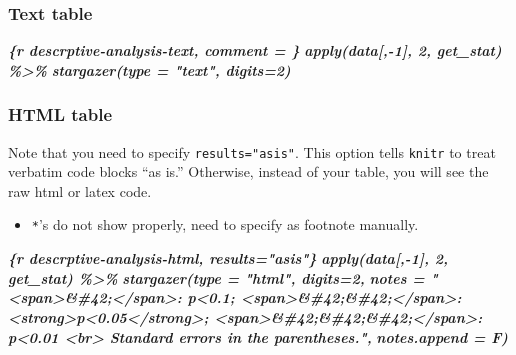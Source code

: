\documentclass[
  a4paper,
  twoside,
  openright]{book}
\newenvironment{Shaded}{\begin{snugshade}}{\end{snugshade}}
\newcommand{\InformationTok}[1]{\textcolor[rgb]{0.56,0.35,0.01}{\textbf{\textit{#1}}}}
\providecommand{\tightlist}{%
  \setlength{\itemsep}{0pt}\setlength{\parskip}{0pt}}
\theoremstyle{definition}
\theoremstyle{definition}
\theoremstyle{definition}
\theoremstyle{definition}
\theoremstyle{remark}
\begin{document}
\subsubsection*{Text table}\label{text-table}

\begin{Shaded}
\begin{Highlighting}[]
\InformationTok{\textasciigrave{}\textasciigrave{}\textasciigrave{}\{r descrptive{-}analysis{-}text, comment = \textquotesingle{}\textquotesingle{}\}}
\InformationTok{apply(data[,{-}1], 2, get\_stat) \%\textgreater{}\% }
\InformationTok{    stargazer(type = "text", digits=2)}
\InformationTok{\textasciigrave{}\textasciigrave{}\textasciigrave{}}
\end{Highlighting}
\end{Shaded}

\subsubsection*{HTML table}\label{html-table}

Note that you need to specify \texttt{results="asis"}. This option tells \texttt{knitr} to treat verbatim code blocks ``as is.'' Otherwise, instead of your table, you will see the raw html or latex code.

\begin{itemize}
\tightlist
\item
  \texttt{*}'s do not show properly, need to specify as footnote manually.
\end{itemize}

\begin{Shaded}
\begin{Highlighting}[]
\InformationTok{\textasciigrave{}\textasciigrave{}\textasciigrave{}\{r descrptive{-}analysis{-}html, results="asis"\}}
\InformationTok{apply(data[,{-}1], 2, get\_stat) \%\textgreater{}\% }
\InformationTok{    stargazer(type = "html", digits=2, }
\InformationTok{              notes = "\textless{}span\textgreater{}\&\#42;\textless{}/span\textgreater{}: p\textless{}0.1; \textless{}span\textgreater{}\&\#42;\&\#42;\textless{}/span\textgreater{}: \textless{}strong\textgreater{}p\textless{}0.05\textless{}/strong\textgreater{}; \textless{}span\textgreater{}\&\#42;\&\#42;\&\#42;\textless{}/span\textgreater{}: p\textless{}0.01 \textless{}br\textgreater{} Standard errors in the parentheses.",}
\InformationTok{              notes.append = F)}
\InformationTok{\textasciigrave{}\textasciigrave{}\textasciigrave{}}
\end{Highlighting}
\end{Shaded}
\end{document}
